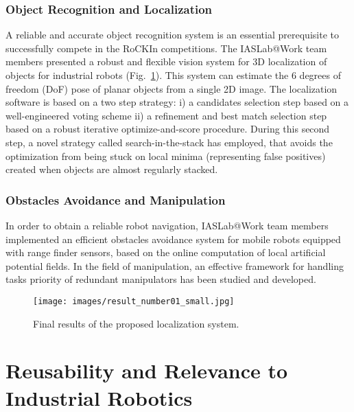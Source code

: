 \documentclass[conference]{IEEEtran}
\begin{document}
\subsubsection{Object Recognition and Localization}\label{sec:object_rec}
A reliable and accurate object recognition system is an essential prerequisite to successfully compete in the RoCKIn competitions. The IASLab@Work team members presented a robust and flexible vision system for 3D localization of objects for industrial robots \cite{prettoCASE2013} (Fig.~\ref{fig:obj_rec}). This system can estimate the 6 degrees of freedom (DoF) pose of planar objects from a single 2D image.
The localization software is based on a two step strategy: i) a candidates selection step based on a well-engineered voting scheme ii) a refinement and best match selection step based on a robust iterative optimize-and-score procedure. During this second step, a novel strategy called search-in-the-stack has employed, that avoids the optimization from
being stuck on local minima (representing false positives) created when objects are almost regularly stacked.

\subsubsection{Obstacles Avoidance and Manipulation}\label{sec:manipulation}
In order to obtain a reliable robot navigation, IASLab@Work team members implemented an efficient obstacles avoidance system for mobile robots equipped with range finder sensors, based on the online computation of local artificial potential fields. \newline In the field of manipulation, an effective framework for handling tasks priority of redundant manipulators has been studied and developed.
\begin{figure}[t!]
\begin{center}
\texttt{[image: images/result\_number01\_small.jpg]}
\end{center}
\caption{Final results of the proposed localization system.}\label{fig:obj_rec}
\end{figure}

\section{Reusability and Relevance to Industrial Robotics}
\end{document}
